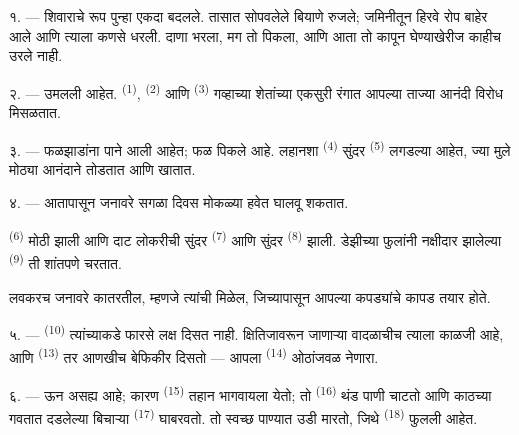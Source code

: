 
\VUsaut{5.0mm}
\VUsaut{3.0mm}
\VUsaut{3.0mm}
\VUsaut{4.0mm}
\VUsaut{3.0mm}

१. ---  शिवाराचे रूप पुन्हा एकदा बदलले. तासात सोपवलेले बियाणे रुजले;
जमिनीतून हिरवे रोप बाहेर आले आणि त्याला कणसे धरली. दाणा भरला, मग तो पिकला, आणि आता तो कापून
घेण्याखेरीज काहीच उरले नाही.

२. ---  उमलली आहेत.  \textsuperscript{(1)},
 \textsuperscript{(2)} आणि  \textsuperscript{(3)}
गव्हाच्या शेतांच्या एकसुरी रंगात आपल्या ताज्या  आनंदी विरोध मिसळतात.

३. --- फळझाडांना पाने आली आहेत; फळ पिकले आहे. लहानशा 
\textsuperscript{(4)} सुंदर  \textsuperscript{(5)} लगडल्या आहेत, ज्या मुले मोठ्या
आनंदाने तोडतात आणि खातात.

४. --- आतापासून जनावरे सगळा दिवस मोकळ्या हवेत घालवू शकतात.

 \textsuperscript{(6)} मोठी झाली आणि दाट लोकरीची सुंदर  \textsuperscript{(7)} आणि सुंदर  \textsuperscript{(8)} झाली. डेझीच्या फुलांनी नक्षीदार झालेल्या  \textsuperscript{(9)}  ती शांतपणे चरतात.

लवकरच  जनावरे कातरतील, म्हणजे त्यांची  मिळेल, जिच्यापासून आपल्या
कपड्यांचे कापड तयार होते.

\VUsaut{5.0mm}
\VUsaut{3.4mm}

५. ---  \textsuperscript{(10)} त्यांच्याकडे फारसे लक्ष दिसत नाही. क्षितिजावरून
जाणाऱ्या वादळाचीच त्याला काळजी आहे, आणि  \textsuperscript{(13)} तर आणखीच
बेफिकीर दिसतो — आपला  \textsuperscript{(14)} ओठांजवळ नेणारा.

६. --- ऊन असह्य आहे; कारण  \textsuperscript{(15)} तहान भागवायला येतो; तो
 \textsuperscript{(16)} थंड पाणी चाटतो आणि काठच्या गवतात दडलेल्या बिचाऱ्या
 \textsuperscript{(17)} घाबरवतो. तो स्वच्छ पाण्यात उडी मारतो, जिथे
 \textsuperscript{(18)} फुलली आहेत.

